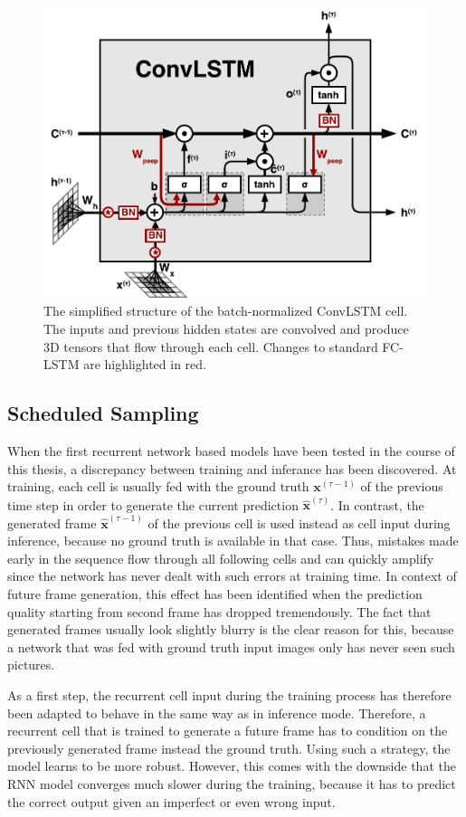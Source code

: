 \begin{figure}[htpb]
	\centering
	\includegraphics[width=0.7\linewidth]{figures/convlstm.pdf} 
	\caption[ConvLSTM Cell]{The simplified structure of the batch-normalized ConvLSTM cell. The inputs and previous hidden states are convolved and produce 3D tensors that flow through each cell. Changes to standard FC-LSTM are highlighted in red.} \label{fig:convlstm-cell}
\end{figure}


\subsection{Scheduled Sampling} \label{sec:sched_sample}

When the first recurrent network based models have been tested in the course of this thesis, a discrepancy between training and inferance has been discovered. At training, each cell is usually fed with the ground truth $\textbf{x}^{(\tau-1)}$ of the previous time step in order to generate the current prediction $\hat{\textbf{x}}^{(\tau)}$. In contrast, the generated frame $ \hat{\textbf{x}}^{(\tau-1)}$ of the previous cell is used instead as cell input during inference, because no ground truth is available in that case. Thus, mistakes made early in the sequence flow through all following cells and can quickly amplify since the network has never dealt with such errors at training time. In context of future frame generation, this effect has been identified when the prediction quality starting from second frame has dropped tremendously. The fact that generated frames usually look slightly blurry is the clear reason for this, because a network that was fed with ground truth input images only has never seen such pictures.

As a first step, the recurrent cell input during the training process has therefore been adapted to behave in the same way as in inference mode. Therefore, a recurrent cell that is trained to generate a future frame has to condition on the previously generated frame instead the ground truth. Using such a strategy, the model learns to be more robust. However, this comes with the downside that the RNN model converges much slower during the training, because it has to predict the correct output given an imperfect or even wrong input.

